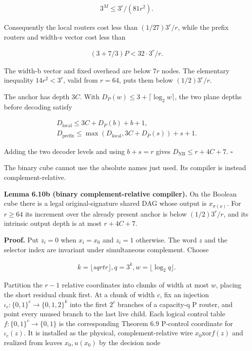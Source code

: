 \documentclass[
  11pt,
]{article}
\theoremstyle{definition}
\theoremstyle{remark}
\begin{document}
\[
\begin{aligned}
3^M \le  3^r/(81r^2).
\end{aligned}
\]

Consequently the local routers cost less than \((1/27)3^r/r\), while the
prefix routers and width-s vector cost less than

\[
\begin{aligned}
(3+7/3)P < 32\mathbin{\cdot}3^r/r.
\end{aligned}
\]

The width-b vector and fixed overhead are below \(7r\) nodes. The
elementary inequality \(14r^2<3^r\), valid from \(r=64\), puts them
below \((1/2)3^r/r\).

The anchor has depth \(3C\). With
\(D_P(w)\le 3+\lceil \log_2 w \rceil\), the two plane depths before
decoding satisfy

\[
\begin{aligned}
D_{\mathrm{local}}  \le  3C+D_P(b)+b+1, \\
D_{\mathrm{prefix}} \le  \max(D_{\mathrm{local}},3C+D_P(s))+s+1.
\end{aligned}
\]

Adding the two decoder levels and using \(b+s=r\) gives
\(D_{\mathrm{NB}}\le r+4C+7\). \(\square\)

The binary cube cannot use the absolute names just used. Its compiler is
instead complement-relative.

\textbf{Lemma 6.10b (binary complement-relative compiler).} On the
Boolean cube there is a legal original-signature shared DAG whose output
is \(x_{\sigma(x)}\). For \(r\ge 64\) its increment over the already
present anchor is below \((1/2)3^r/r\), and its intrinsic output depth
is at most \(r+4C+7\).

\textbf{Proof.} Put \(z_i=0\) when \(x_i=x_0\) and \(z_i=1\) otherwise.
The word \(z\) and the selector index are invariant under simultaneous
complement. Choose

\[
\begin{aligned}
k=\lfloor sqrt r \rfloor,  q=3^k,  w=\lfloor \log_2 q \rfloor.
\end{aligned}
\]

Partition the \(r-1\) relative coordinates into chunks of width at most
\(w\), placing the short residual chunk first. At a chunk of width
\(c\), fix an injection \(\iota_c:\{0,1\}^c\to \{0,1,2\}^k\) into the
first \(2^c\) branches of a capacity-q P router, and point every unused
branch to the last live child. Each logical control table
\(f:\{0,1\}^c\to \{0,1\}\) is the corresponding Theorem 6.9 P-control
coordinate for \(\iota_c(z)\). It is installed as the physical,
complement-relative wire \(x_0 \mathbin{\mathrm{xor}} f(z)\) and
realized from leaves \(x_0,u(x_0)\) by the decision node
\end{document}
